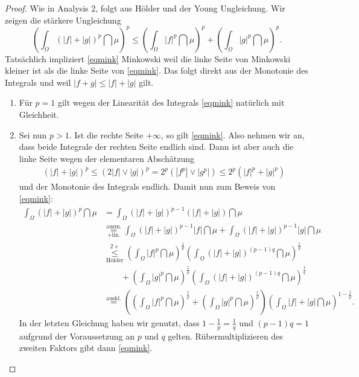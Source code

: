 \begin{proof}
	Wie in Analysis 2, folgt aus H\"older und der Young Ungleichung. Wir zeigen die st\"arkere Ungleichung
	\begin{equation}\label{eqmink}
	\left( \int_{\Omega} (|f|+|g|)^p \dint \mu \right)^p \leq \left( \int_{\Omega} |f|^p \dint \mu \right)^p + \left( \int_{\Omega} |g|^p \dint \mu \right)^p.
	\end{equation}
	Tats\"achlich impliziert \eqref{eqmink} Minkowski weil die linke Seite von Minkowski kleiner ist als die linke Seite von \eqref{eqmink}. Das folgt direkt aus der Monotonie des Integrals und weil $|f+g| \leq |f| + |g|$ gilt.
	\begin{enumerate}[label=(\alph*)]
		\item F\"ur $p=1$ gilt wegen der Linearit\"at des Integrals \eqref{eqmink} nat\"urlich mit Gleichheit.
		\item Sei nun $p > 1$. Ist die rechte Seite $+\infty$, so gilt \eqref{eqmink}. Also nehmen wir an, dass beide Integrale der rechten Seite endlich sind. Dann ist aber auch die linke Seite wegen der elementaren Absch\"atzung 
		\begin{align*}
		\left(|f| + |g|\right)^p \leq \left(2 |f| \lor |g|\right)^p = 2^p( |f^p| \lor |g^p|)\leq 2^p (|f|^p+|g|^p)
		\end{align*}
		und der Monotonie des Integrals endlich. Damit nun zum Beweis von \eqref{eqmink}:
		\begin{align*}	
		\int_{\Omega} (|f|+|g|)^p \dint \mu &= 
		\int_{\Omega} (|f|+|g|)^{p-1} (|f|+|g|) \dint \mu\\ 
		&\overset{\text{ausm.}}{\underset{+\text{lin.}}{=}}
		\int_{\Omega} (|f|+|g|)^{p-1} |f| \dint \mu + \int_{\Omega} (|f|+|g|)^{p-1} |g| \dint \mu \\
		&\overset{2\times}{\underset{\text{H\"older}}{\leq}} 
		\left( \int_{\Omega} |f|^{p} \dint \mu \right)^{\frac{1}{p}} \left( \int_{\Omega} (|f|+|g|)^{(p-1)q} \dint \mu \right)^{\frac{1}{q}} \\
		&\qquad+\left( \int_{\Omega} |g|^{p} \dint \mu \right)^{\frac{1}{p}} \left( \int_{\Omega} (|f|+|g|)^{(p-1)q} \dint \mu \right)^{\frac{1}{q}}\\
		&\overset{\text{auskl.}}{=}
		\left(\left( \int_{\Omega} |f|^{p} \dint \mu \right)^{\frac{1}{p}} + \left( \int_{\Omega} |g|^{p} \dint \mu \right)^{\frac{1}{p}}\right) \left(\int_{\Omega} |f|+|g| \dint \mu \right)^{1 - \frac{1}{p}}.
		\end{align*}
		In der letzten Gleichung haben wir genutzt, dass $1-\frac{1}{p}=\frac{1}{q}$ und $(p-1)q=1$ aufgrund der Voraussetzung an $p$ und $q$ gelten. Rübermultiplizieren des zweiten Faktors gibt dann \eqref{eqmink}.
	\end{enumerate}
\end{proof}

